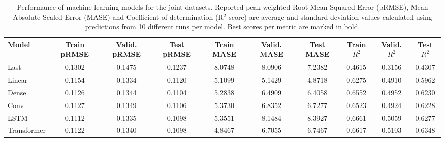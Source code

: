 \begin{table}
\caption{Performance of machine learning models for the joint datasets. Reported peak-weighted Root Mean Squared Error (pRMSE), Mean Absolute Scaled Error (MASE) and Coefficient of determination (R$^2$ score) are average and standard deviation values calculated using predictions from 10 different runs per model. Best scores per metric are marked in bold.}
\label{tab:ml_perf_both}
\begin{tabular}{lccccccccc}
\toprule
Model & Train pRMSE & Valid. pRMSE & Test pRMSE & Train MASE & Valid. MASE & Test MASE & Train $R^2$ & Valid. $R^2$ & Test $R^2$ \\
\midrule
Last & 0.1302 & 0.1475 & 0.1237 & 8.0748 & 8.0906 & 7.2382 & 0.4615 & 0.3156 & 0.4307 \\
Linear & 0.1154 & 0.1334 & 0.1120 & 5.1099 & 5.1429 & 4.8718 & 0.6275 & 0.4910 & 0.5962 \\
Dense & 0.1126 & 0.1344 & 0.1104 & 5.2838 & 6.4909 & 6.4058 & 0.6552 & 0.4952 & 0.6230 \\
Conv & 0.1127 & 0.1349 & 0.1106 & 5.3730 & 6.8352 & 6.7277 & 0.6523 & 0.4924 & 0.6228 \\
LSTM & 0.1112 & 0.1335 & 0.1098 & 5.3551 & 8.1484 & 8.3927 & 0.6661 & 0.5059 & 0.6277 \\
Transformer & 0.1122 & 0.1340 & 0.1098 & 4.8467 & 6.7055 & 6.7467 & 0.6617 & 0.5103 & 0.6348 \\
\bottomrule
\end{tabular}
\end{table}
